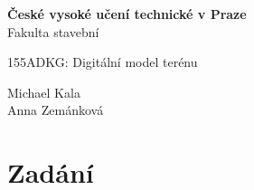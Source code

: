 \documentclass[a4paper, 12pt]{article}
\begin{document}
\begin{titlepage}
\begin{center}
\noindent
\Large \textbf{České vysoké učení technické v Praze }\\ Fakulta stavební
\vspace{5cm}

\huge


\vspace{0.5cm}

155ADKG: Digitální model terénu \\

\vspace{10cm}




\Large
Michael Kala\\
Anna Zemánková \\

\end{center}

\end{titlepage}




\pagestyle{plain}     %
\setcounter{page}{1}  %


\section{Zadání}
\end{document}
